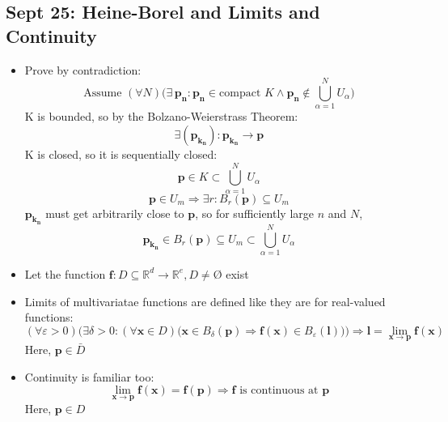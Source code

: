 \documentclass[10pt, oneside]{article}
\newcommand{\R}{\mathbb{R}}
\let \foo \O
\renewcommand{\O}{\text{\foo}}
\renewcommand{\vec}[1]{\mathbf{#1}}
\newcommand{\vecf}[1]{\boldsymbol{#1}}
\begin{document}
\subsection{Sept 25: Heine-Borel and Limits and Continuity}
\begin{itemize}
    \item Prove by contradiction:
        \[\text{Assume } (\forall N) \bigg( \exists \, \vec{p_n} : \vec{p_n} \in \text{compact } K \land \vec{p_n} \notin \bigcup_{\alpha = 1}^N U_\alpha \bigg)\]
        K is bounded, so by the Bolzano-Weierstrass Theorem:
        \[\exists (\vec{p_{k_n}}) : \vec{p_{k_n}} \rightarrow \vec{p}\]
        K is closed, so it is sequentially closed:
        \[\vec{p} \in K \subset \bigcup_{\alpha = 1}^N U_\alpha\]
        \[\vec{p} \in U_m \Rightarrow \exists r : B_r(\vec{p}) \subseteq U_m\]
        $\vec{p_{k_n}}$ must get arbitrarily close to $\vec{p}$, so for sufficiently large $n$ and $N$,
        \[\vec{p_{k_n}} \in B_r(\vec{p}) \subseteq U_m \subset \bigcup_{\alpha = 1}^N U_\alpha\]
    \item Let the function $\vec{f} : D \subseteq \R^d \rightarrow \R^e, D \neq \O$ exist
    \item Limits of multivariatae functions are defined like they are for real-valued functions:
        \[(\forall \varepsilon > 0) \Big(\exists \delta > 0 : (\forall \vec{x} \in D) \big(\vec{x} \in B_\delta(\vec{p}) \Rightarrow \vecf{f}(\vec{x}) \in B_\varepsilon(\vec{l}) \big) \Big) \Rightarrow \vec{l} = \lim_{\vec{x} \rightarrow \vec{p}} \vecf{f}(\vec{x})\]
        Here, $\vec{p} \in \bar{D}$
    \item Continuity is familiar too:
        \[\lim_{\vec{x} \rightarrow \vec{p}} \vecf{f}(\vec{x}) = \vecf{f}(\vec{p}) \Rightarrow \vecf{f} \text{ is continuous at $\vec{p}$}\]
        Here, $\vec{p} \in D$
\end{itemize}
\end{document}
